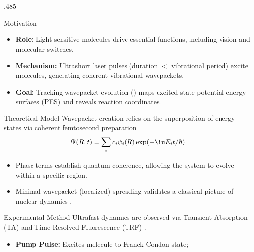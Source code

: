 \documentclass[mode = poster]{westlakethesis}
\begin{document}
\begin{frame}

\maketitle

\begin{columns}[T, onlytextwidth]
  \begin{column}{.485\linewidth}
    \begin{block}{Motivation}
      \begin{itemize}
        \item \textbf{Role:} Light-sensitive molecules drive essential
        functions, including vision and molecular switches.
        \item \textbf{Mechanism:} Ultrashort laser pulses (duration $<$
        vibrational period) excite molecules, generating coherent vibrational
        wavepackets\cite{zewail2000femtochemistry}.
        \item \textbf{Goal:} Tracking wavepacket evolution
        () maps excited-state potential energy
        surfaces (PES) and reveals reaction coordinates.
      \end{itemize}
    \end{block}
    \begin{exampleblock}{Theoretical Model}
      Wavepacket creation relies on the superposition of energy states via
      coherent femtosecond preparation
      \begin{equation}
        \Psi(R,t) = \sum_i c_i \psi_i(R) \exp(-\iu E_it/\hbar)
        \label{eq:wavepacket}
      \end{equation}
      \vskip-6pt
      \begin{itemize}
        \item Phase terms establish quantum coherence, allowing the system to
        evolve within a specific region.
        \item Minimal wavepacket (localized) spreading validates a classical
        picture of nuclear dynamics \cite{zewail2000femtochemistry}.
      \end{itemize}
    \end{exampleblock}
    \begin{exampleblock}{Experimental Method}
      Ultrafast dynamics are observed via Transient Absorption (TA) and
      Time-Resolved Fluorescence (TRF) \cite{liebel2015principles}.
      \begin{itemize}
        \item \textbf{Pump Pulse:} Excites molecule to Franck-Condon state;

\end{itemize}
\end{exampleblock}
\end{column}
\end{columns}
\end{frame}
\end{document}
